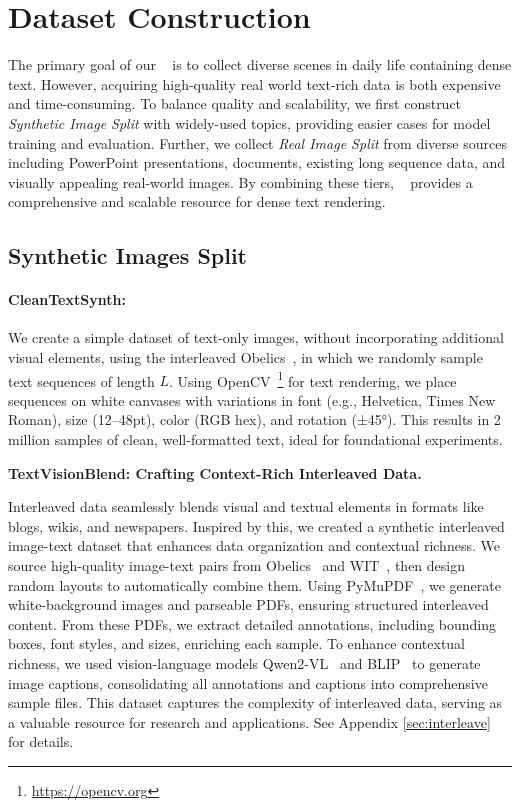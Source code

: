 \section{Dataset Construction}

The primary goal of our \DatasetName~ is to collect diverse scenes in daily life containing dense text. 
However, acquiring high-quality real world text-rich data is both expensive and time-consuming. 
To balance quality and scalability, we first construct \textit{Synthetic Image Split} with widely-used topics, providing easier cases for model training and evaluation.
Further, we collect \textit{Real Image Split} from diverse sources including PowerPoint presentations, documents, existing long sequence data, and visually appealing real-world images.
By combining these tiers, \DatasetName~ provides a comprehensive and scalable resource for dense text rendering.

\subsection{Synthetic Images Split}


\paragraph{CleanTextSynth:}
We create a simple dataset of text-only images, without incorporating additional visual elements, using the interleaved Obelics~\cite{obelics}, in which we randomly sample text sequences of length $L$.
Using OpenCV~\footnote{\url{https://opencv.org}} for text rendering, we place sequences on white canvases with variations in font (e.g., Helvetica, Times New Roman), size (12–48pt), color (RGB hex), and rotation (±45°). This results in 2 million samples of clean, well-formatted text, ideal for foundational experiments.



\textbf{TextVisionBlend: Crafting Context-Rich Interleaved Data.}

Interleaved data seamlessly blends visual and textual elements in formats like blogs, wikis, and newspapers. Inspired by this, we created a synthetic interleaved image-text dataset that enhances data organization and contextual richness.
We source high-quality image-text pairs from Obelics~\cite{obelics} and WIT~\cite{wit}, then design random layouts to automatically combine them. 
Using PyMuPDF~\cite{pymupdf}, we generate white-background images and parseable PDFs, ensuring structured interleaved content. From these PDFs, we extract detailed annotations, including bounding boxes, font styles, and sizes, enriching each sample.
To enhance contextual richness, we used vision-language models Qwen2-VL~\cite{qwen2_vl} and BLIP~\cite{blip} to generate image captions, consolidating all annotations and captions into comprehensive sample files. This dataset captures the complexity of interleaved data, serving as a valuable resource for research and applications. See Appendix \ref{sec:interleave} for details.

